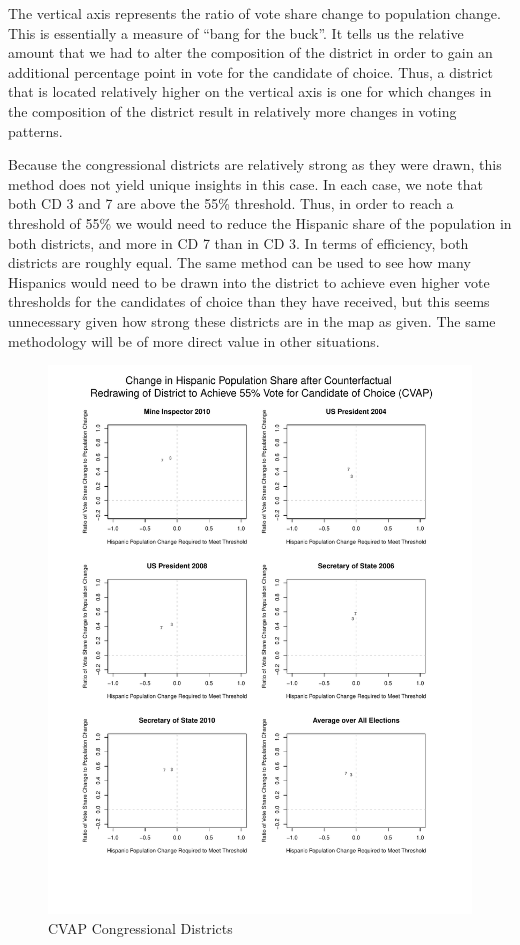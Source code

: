 \documentclass[12pt]{article}
\begin{document}
The vertical axis represents the ratio of vote share change to
population change. This is essentially a measure of ``bang for the
buck''. It tells us the relative amount that we had to alter the
composition of the district in order to gain an additional percentage
point in vote for the candidate of choice. Thus, a district that is
located relatively higher on the vertical axis is one for which
changes in the composition of the district result in relatively more
changes in voting patterns.

Because the congressional districts are relatively strong as they were
drawn, this method does not yield unique insights in this case.  In
each case, we note that both CD 3 and 7 are above the 55\% threshold.
Thus, in order to reach a threshold of 55\% we would need to reduce
the Hispanic share of the population in both districts, and more in CD
7 than in CD 3. In terms of efficiency, both districts are roughly
equal.  The same method can be used to see how many Hispanics would
need to be drawn into the district to achieve even higher vote
thresholds for the candidates of choice than they have received,
but this seems unnecessary given how strong these districts are in the
map as given. The same methodology will be of more direct value in
other situations.
\begin{figure}[p!h]
  \begin{centering}
    \includegraphics[scale=.8]{figs/cvap_cd_performance_ratio.pdf}
    \caption{\label{cvap_cd_performance_ratio}CVAP Congressional Districts}
  \end{centering}
\end{figure}
\end{document}
